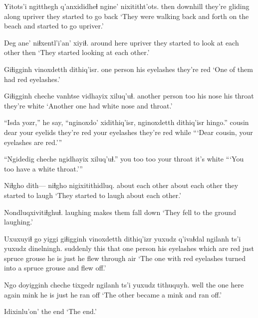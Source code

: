 \documentclass[12pt]{article}
\begin{document}
\gll Yitots'i ngitthegh q'anxididheɬ ngine' nixititht'ots.
then downhill {they're gliding along} upriver {they started to go back}
\glt `They were walking back and forth on the beach and started to go upriver.'
\glend

\gll Deg ane' niɬxentl'i'an' xiyiɬ.
{around here} {upriver} {they started to look at each other} then
\glt `They started looking at each other.'
\glend

\gll Giɬigginh vinoxdetth dithiq'isr.
{one person} {his eyelashes} {they're red}
\glt `One of them had red eyelashes.'
\glend

\gll Giɬigginh cheche vanhtse vidhayix xiluq'uɬ.
{another person} too {his nose} {his throat} {they're white}
\glt `Another one had white nose and throat.'
\glend

\gll ``Isda yozr,'' {he say,} ``nginoxdo' xidithiq'isr, nginoxdetth dithiq'isr hingo.'' 
cousin dear {} {your eyelids} {they're red} {your eyelashes} {they're red} while 
\glt ```Dear cousin, your eyelashes are red.'''
\glend

\gll ``Ngidedig cheche ngidhayix xiluq'uɬ.''
{you too} too {your throat} {it's white}
\glt ```You too have a white throat.'''
\glend

\gll Niɬgho dith--- niɬgho nigixitithidluq.
{about each other} {} {about each other} {they started to laugh}
\glt `They started to laugh about each other.'
\glend

\gll Nondluqxivitiɬghuɬ.
{{laughing makes them fall down}}
\glt `They fell to the ground laughing.'
\glend

\gll Uxuxuyiɬ go yiggi giɬigginh vinoxdetth dithiq'izr yuxudz q'ivaɬdal ngilanh ts'i yuxudz dinelningh.
suddenly this that {one person} {his eyelashes} {which are red} just {spruce grouse} {he is} {} just {he flew through air}
\glt  `The one with red eyelashes turned into a spruce grouse and flew off.'
\glend

\gll Ngo doyigginh cheche tixgedr ngilanh ts'i yuxudz tithuquyh.
well {the one here} again mink {he is} {} just {he ran off}
\glt `The other became a mink and ran off.'
\glend

\gll Idixinlu'on'
{{the end}}
\glt `The end.'
\glend
\end{document}
